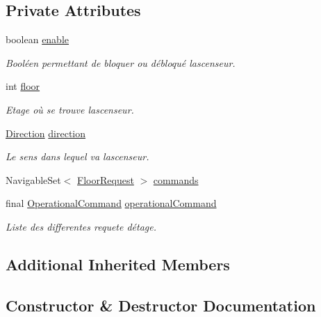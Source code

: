 \subsection*{Private Attributes}
\begin{DoxyCompactItemize}
\item 
boolean \mbox{\hyperlink{classcontrol_1_1_impl_command_control_a80ffb0738b94ae89c8b32d60f9f2fcd0}{enable}}
\begin{DoxyCompactList}\small\item\em Booléen permettant de bloquer ou débloqué l\textquotesingle{}ascenseur. \end{DoxyCompactList}\item 
int \mbox{\hyperlink{classcontrol_1_1_impl_command_control_acbd6195b1d21b55b2c9c96d144f98671}{floor}}
\begin{DoxyCompactList}\small\item\em Etage où se trouve l\textquotesingle{}ascenseur. \end{DoxyCompactList}\item 
\mbox{\hyperlink{enumcontrol_1_1command_1_1_direction}{Direction}} \mbox{\hyperlink{classcontrol_1_1_impl_command_control_ae982796e5a99ef48f6b9db87ddb82ad7}{direction}}
\begin{DoxyCompactList}\small\item\em Le sens dans lequel va l\textquotesingle{}ascenseur. \end{DoxyCompactList}\item 
Navigable\+Set$<$ \mbox{\hyperlink{classcontrol_1_1command_1_1_floor_request}{Floor\+Request}} $>$ \mbox{\hyperlink{classcontrol_1_1_impl_command_control_afc3d3dfd36511a07dd41e717df3b13f9}{commands}}
\item 
final \mbox{\hyperlink{interfacecontrol_1_1_operational_command}{Operational\+Command}} \mbox{\hyperlink{classcontrol_1_1_impl_command_control_adbe2ee9057a11e4d2408947f5ff83cd5}{operational\+Command}}
\begin{DoxyCompactList}\small\item\em Liste des differentes requete d\textquotesingle{}étage. \end{DoxyCompactList}\end{DoxyCompactItemize}
\subsection*{Additional Inherited Members}


\subsection{Constructor \& Destructor Documentation}
\mbox{\label{classcontrol_1_1_impl_command_control_ae6bd16309a6cd954c9dd44244ed6cdd3}} 
